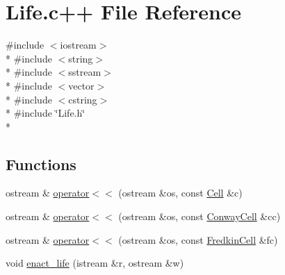 \hypertarget{Life_8c_09_09}{\section{Life.\-c++ File Reference}
\label{Life_8c_09_09}
}
{\ttfamily \#include $<$iostream$>$}\\*
{\ttfamily \#include $<$string$>$}\\*
{\ttfamily \#include $<$sstream$>$}\\*
{\ttfamily \#include $<$vector$>$}\\*
{\ttfamily \#include $<$cstring$>$}\\*
{\ttfamily \#include \char`\"{}Life.\-h\char`\"{}}\\*
\subsection*{Functions}
\begin{DoxyCompactItemize}
\item 
ostream \& \hyperlink{Life_8c_09_09_ae254f299bfa3722186f36aaee153f869}{operator$<$$<$} (ostream \&os, const \hyperlink{classCell}{Cell} \&c)
\item 
ostream \& \hyperlink{Life_8c_09_09_a6ce5e46e5ef2f35223787462a562d066}{operator$<$$<$} (ostream \&os, const \hyperlink{classConwayCell}{Conway\-Cell} \&cc)
\item 
ostream \& \hyperlink{Life_8c_09_09_af9362bce0b651c9fce1dd255e55290d8}{operator$<$$<$} (ostream \&os, const \hyperlink{classFredkinCell}{Fredkin\-Cell} \&fc)
\item 
void \hyperlink{Life_8c_09_09_a1a58f997987d528f1659dcbb7406c7b5}{enact\-\_\-life} (istream \&r, ostream \&w)
\end{DoxyCompactItemize}


